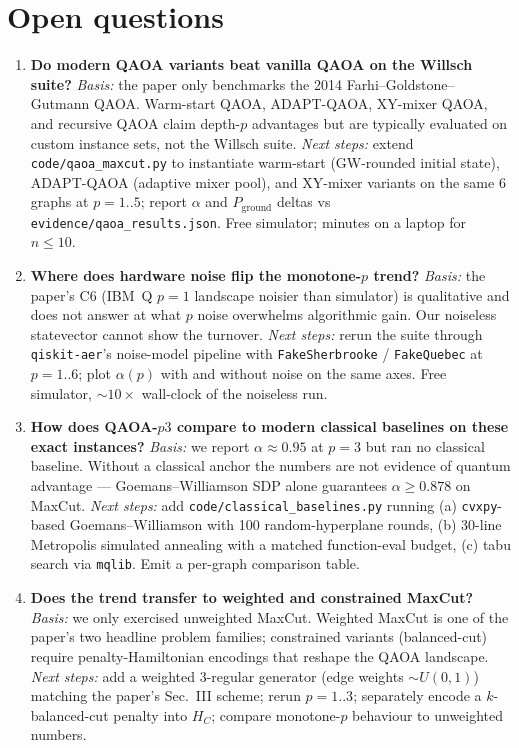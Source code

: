 \section{Open questions}

\begin{enumerate}
\item \textbf{Do modern QAOA variants beat vanilla QAOA on the Willsch suite?}
\emph{Basis:} the paper only benchmarks the 2014 Farhi--Goldstone--Gutmann QAOA. Warm-start QAOA, ADAPT-QAOA, XY-mixer QAOA, and recursive QAOA claim depth-$p$ advantages but are typically evaluated on custom instance sets, not the Willsch suite.
\emph{Next steps:} extend \texttt{code/qaoa\_maxcut.py} to instantiate warm-start (GW-rounded initial state), ADAPT-QAOA (adaptive mixer pool), and XY-mixer variants on the same 6 graphs at $p=1..5$; report $\alpha$ and $P_{\text{ground}}$ deltas vs \texttt{evidence/qaoa\_results.json}. Free simulator; minutes on a laptop for $n\le 10$.

\item \textbf{Where does hardware noise flip the monotone-$p$ trend?}
\emph{Basis:} the paper's C6 (IBM~Q $p=1$ landscape noisier than simulator) is qualitative and does not answer at what $p$ noise overwhelms algorithmic gain. Our noiseless statevector cannot show the turnover.
\emph{Next steps:} rerun the suite through \texttt{qiskit-aer}'s noise-model pipeline with \texttt{FakeSherbrooke} / \texttt{FakeQuebec} at $p=1..6$; plot $\alpha(p)$ with and without noise on the same axes. Free simulator, $\sim 10\times$ wall-clock of the noiseless run.

\item \textbf{How does QAOA-$p3$ compare to modern classical baselines on these exact instances?}
\emph{Basis:} we report $\alpha\approx 0.95$ at $p=3$ but ran no classical baseline. Without a classical anchor the numbers are not evidence of quantum advantage --- Goemans--Williamson SDP alone guarantees $\alpha\ge 0.878$ on MaxCut.
\emph{Next steps:} add \texttt{code/classical\_baselines.py} running (a) \texttt{cvxpy}-based Goemans--Williamson with 100 random-hyperplane rounds, (b) 30-line Metropolis simulated annealing with a matched function-eval budget, (c) tabu search via \texttt{mqlib}. Emit a per-graph comparison table.

\item \textbf{Does the trend transfer to weighted and constrained MaxCut?}
\emph{Basis:} we only exercised unweighted MaxCut. Weighted MaxCut is one of the paper's two headline problem families; constrained variants (balanced-cut) require penalty-Hamiltonian encodings that reshape the QAOA landscape.
\emph{Next steps:} add a weighted 3-regular generator (edge weights $\sim U(0,1)$) matching the paper's Sec.~III scheme; rerun $p=1..3$; separately encode a $k$-balanced-cut penalty into $H_C$; compare monotone-$p$ behaviour to unweighted numbers.


\end{enumerate}
